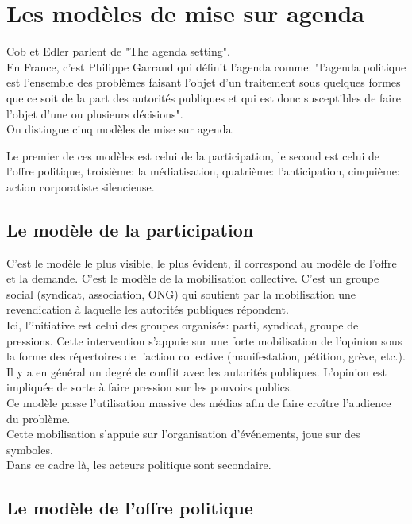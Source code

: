 \documentclass[10pt, a4paper, openany]{book}
\begin{document}
\section{Les modèles de mise sur agenda}

Cob et Edler parlent de "The agenda setting". \\
En France, c'est Philippe Garraud qui définit l'agenda comme: "l'agenda politique est l'ensemble des problèmes faisant l'objet d'un traitement sous quelques formes que ce soit de la part des autorités publiques et qui est donc susceptibles de faire l'objet d'une ou plusieurs décisions". \\
On distingue cinq modèles de mise sur agenda.


Le premier de ces modèles est celui de la participation, le second est celui de l'offre politique, troisième: la médiatisation, quatrième: l'anticipation, cinquième: action corporatiste silencieuse. 

\subsection{Le modèle de la participation}

C'est le modèle le plus visible, le plus évident, il correspond au modèle de l'offre et la demande. C'est le modèle de la mobilisation collective. C'est un groupe social (syndicat, association, ONG) qui soutient par la mobilisation une revendication à laquelle les autorités publiques répondent. \\
Ici, l'initiative est celui des groupes organisés: parti, syndicat, groupe de pressions. Cette intervention s'appuie sur une forte mobilisation de l'opinion sous la forme des répertoires de l'action collective (manifestation, pétition, grève, etc.). Il y a en général un degré de conflit avec les autorités publiques. L'opinion est impliquée de sorte à faire pression sur les pouvoirs publics. \\
Ce modèle passe l'utilisation massive des médias afin de faire croître l'audience du problème. \\
Cette mobilisation s'appuie sur l'organisation d'événements, joue sur des symboles. \\
Dans ce cadre là, les acteurs politique sont secondaire.

\subsection{Le modèle de l'offre politique}
\end{document}
